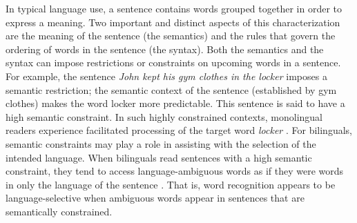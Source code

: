 In typical language use, a sentence contains words grouped together in order to express a meaning. Two important and distinct aspects of this characterization are the meaning of the sentence (the semantics) and the rules that govern the ordering of words in the sentence (the syntax). Both the semantics and the syntax can impose restrictions or constraints on upcoming words in a sentence. For example, the sentence \textit{John kept his gym clothes in the locker} imposes a semantic restriction; the semantic context of the sentence (established by gym clothes) makes the word locker more predictable. This sentence is said to have a high semantic constraint. In such highly constrained contexts, monolingual readers experience facilitated processing of the  target word \textit{locker} \parencite[e.g.,][]{Schwanenflugel1988, Stanovich1983}. For bilinguals, semantic constraints may play a role in assisting with the selection of the intended language. When bilinguals read sentences with a high semantic constraint, they tend to access language-ambiguous words as if they were words in only the language of the sentence \parencite[e.g.,][]{Libben2009, Schwartz2006, VanHell2008}. That is, word recognition appears to be language-selective when ambiguous words appear in sentences that are semantically constrained.



